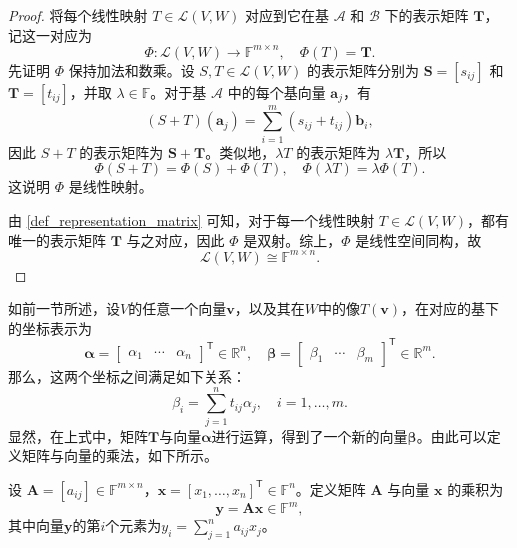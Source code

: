\begin{proof}
    将每个线性映射 \(T\in\mathcal L(V,W)\) 对应到它在基 \(\mathcal A\) 和 \(\mathcal B\) 下的表示矩阵 \(\mathbf T\)，记这一对应为
    \[
        \Phi:\mathcal L(V,W)\to\mathbb F^{m\times n},
        \quad
        \Phi(T)=\mathbf T.
    \]
    先证明 \(\Phi\) 保持加法和数乘。设 \(S,T\in\mathcal L(V,W)\) 的表示矩阵分别为 \(\mathbf S=[s_{ij}]\) 和 \(\mathbf T=[t_{ij}]\)，并取 \(\lambda\in\mathbb F\)。对于基 \(\mathcal A\) 中的每个基向量 \(\bm a_j\)，有
    \[
        (S+T)(\bm a_j)
        =\sum_{i=1}^{m}(s_{ij}+t_{ij})\bm b_i,
    \]
    因此 \(S+T\) 的表示矩阵为 \(\mathbf S+\mathbf T\)。类似地，\(\lambda T\) 的表示矩阵为 \(\lambda\mathbf T\)，所以
    \[
        \Phi(S+T)=\Phi(S)+\Phi(T),
        \quad
        \Phi(\lambda T)=\lambda\Phi(T).
    \]
    这说明 \(\Phi\) 是线性映射。

    由 \cref{def_representation_matrix} 可知，对于每一个线性映射 \(T\in\mathcal L(V,W)\)，都有唯一的表示矩阵 \(\mathbf T\) 与之对应，因此 \(\Phi\) 是双射。综上，\(\Phi\) 是线性空间同构，故
    \[
        \mathcal L(V,W)\cong\mathbb F^{m\times n}.
    \]
\end{proof}

如前一节所述，设\( V \)的任意一个向量\( \bm{v} \)，以及其在\( W \)中的像\( T(\bm{v}) \)，在对应的基下的坐标表示为
\[
    \bm{\alpha} = \begin{bmatrix} \alpha_1 &  \cdots & \alpha_n \end{bmatrix}^{\mathsf{T}} \in \mathbb{R}^n, \quad
    \bm{\beta} = \begin{bmatrix} \beta_1 &  \cdots & \beta_m \end{bmatrix}^{\mathsf{T}} \in \mathbb{R}^m.
\]
那么，这两个坐标之间满足如下关系：
\[
    \beta_i = \sum_{j=1}^{n} t_{ij} \alpha_j, \quad i = 1, \ldots, m.
\]
显然，在上式中，矩阵\( \mathbf{T} \)与向量\( \bm{\alpha} \)进行运算，得到了一个新的向量\( \bm{\beta} \)。由此可以定义矩阵与向量的乘法，如下所示。
\begin{definition}[矩阵与向量的乘法]
    \label{def_matrix_vector_mult}
    设 \(\mathbf{A}=[a_{ij}]\in \mathbb{F}^{m \times n}\)，\(\bm x=[x_1,\ldots,x_n]^{\mathsf T}\in \mathbb{F}^n\)。定义矩阵 \(\mathbf{A}\) 与向量 \(\bm x\) 的乘积为
    \[
        \bm{y} = \mathbf{A}\bm x \in \mathbb{F}^m,
    \]
    其中向量\( \bm{y} \)的第\( i \)个元素为\(y_i=\sum_{j=1}^{n}a_{ij}x_j\)。
\end{definition}

